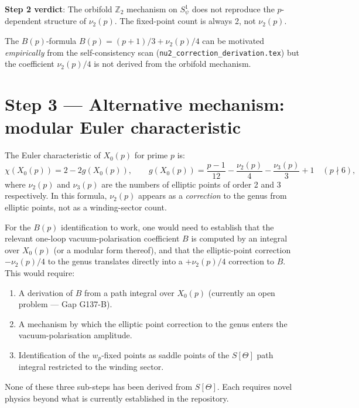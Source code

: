 \documentclass[12pt,a4paper]{article}
\begin{document}
\textbf{Step 2 verdict}: The orbifold $\mathbb{Z}_2$ mechanism on $S^1_\psi$
does not reproduce the $p$-dependent structure of $\nu_2(p)$.
The fixed-point count is always 2, not $\nu_2(p)$.

The $B(p)$-formula $B(p) = (p+1)/3 + \nu_2(p)/4$ can be motivated
\emph{empirically} from the self-consistency scan
(\texttt{nu2\_correction\_derivation.tex}) but the coefficient $\nu_2(p)/4$
is not derived from the orbifold mechanism.

\section{Step 3 — Alternative mechanism: modular Euler characteristic}
\label{sec:step3}

The Euler characteristic of $X_0(p)$ for prime $p$ is:
\begin{equation}
  \chi(X_0(p)) = 2 - 2g(X_0(p)),
  \qquad g(X_0(p)) = \frac{p-1}{12} - \frac{\nu_2(p)}{4} - \frac{\nu_3(p)}{3} + 1
  \quad (p \nmid 6),
\end{equation}
where $\nu_2(p)$ and $\nu_3(p)$ are the numbers of elliptic points of order 2
and 3 respectively.  In this formula, $\nu_2(p)$ appears as a \emph{correction}
to the genus from elliptic points, not as a winding-sector count.

For the $B(p)$ identification to work, one would need to establish that the
relevant one-loop vacuum-polarisation coefficient $B$ is computed by an integral
over $X_0(p)$ (or a modular form thereof), and that the elliptic-point correction
$-\nu_2(p)/4$ to the genus translates directly into a $+\nu_2(p)/4$ correction
to $B$.  This would require:
\begin{enumerate}
  \item A derivation of $B$ from a path integral over $X_0(p)$
        (currently an open problem — Gap G137-B).
  \item A mechanism by which the elliptic point correction to the genus
        enters the vacuum-polarisation amplitude.
  \item Identification of the $w_p$-fixed points as saddle points of the
        $S[\Theta]$ path integral restricted to the winding sector.
\end{enumerate}
None of these three sub-steps has been derived from $S[\Theta]$.
Each requires novel physics beyond what is currently established in the repository.
\end{document}
